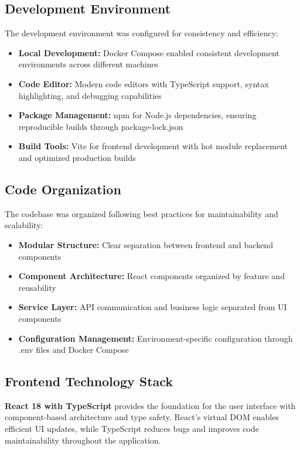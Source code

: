 \documentclass[12pt,a4paper,openany]{book}
\begin{document}
\subsection{Development Environment}

The development environment was configured for consistency and efficiency:

\begin{itemize}
\item \textbf{Local Development:} Docker Compose enabled consistent development environments across different machines
\item \textbf{Code Editor:} Modern code editors with TypeScript support, syntax highlighting, and debugging capabilities
\item \textbf{Package Management:} npm for Node.js dependencies, ensuring reproducible builds through package-lock.json
\item \textbf{Build Tools:} Vite for frontend development with hot module replacement and optimized production builds
\end{itemize}

\subsection{Code Organization}

The codebase was organized following best practices for maintainability and scalability:

\begin{itemize}
\item \textbf{Modular Structure:} Clear separation between frontend and backend components
\item \textbf{Component Architecture:} React components organized by feature and reusability
\item \textbf{Service Layer:} API communication and business logic separated from UI components
\item \textbf{Configuration Management:} Environment-specific configuration through .env files and Docker Compose
\end{itemize}

\subsection{Frontend Technology Stack}

\textbf{React 18 with TypeScript} provides the foundation for the user interface with component-based architecture and type safety. React's virtual DOM enables efficient UI updates, while TypeScript reduces bugs and improves code maintainability throughout the application.
\end{document}
